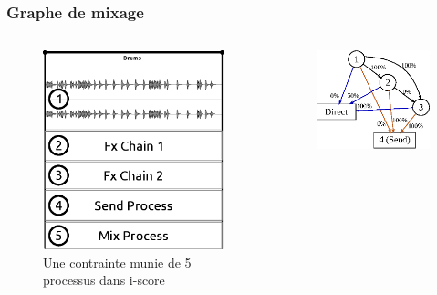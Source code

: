 \documentclass[draft]{beamer}
\begin{document}
\begin{frame}
	\frametitle{Graphe de mixage}    
	\Large
	\begin{columns}
		\begin{column}{0.5\textwidth}
			\begin{figure}
				\centering
				\includegraphics[width=\textwidth]{images/iscore1.eps}
				\caption{Une contrainte munie de 5 processus dans i-score}
			\end{figure}
		\end{column}
		\begin{column}{0.5\textwidth}
			\begin{figure}
				\centering
				\includegraphics[width=\textwidth]{images/graph1.eps}

\end{figure}
\end{column}
\end{columns}
\end{frame}
\end{document}
